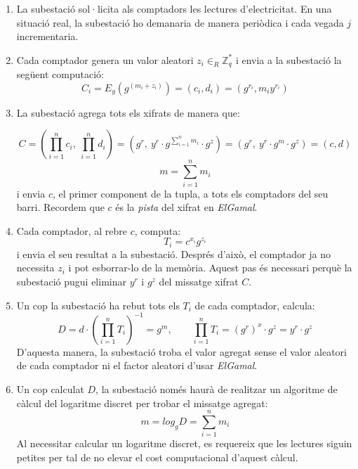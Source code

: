 \begin{enumerate}
	\item La subestació sol·licita als comptadors les lectures d'electricitat. En una situació real, la subestació ho demanaria de manera periòdica i cada vegada $j$ incrementaria.
	\item Cada comptador genera un valor aleatori $z_i \in_R {\mathbb{Z}_{q}^*}$ i envia a la subestació la següent computació: 
	\[C_i = E_y(g^{(m_i + z_i)}) = (c_i, d_i) = (g^{r_i}, m_i y^{r_i})\]
	\item La subestació agrega tots els xifrats de manera que:
	
	\[C = (\prod_{i=1}^{n} c_i, \ \prod_{i=1}^{n} d_i) = (g^r, \ y^r \cdot g ^{\sum_{i=1}^{n} m_i} \cdot g^z) = (g^r, \ y^r \cdot g^m \cdot g^z ) =  (c, d)\]
	\[m = \sum_{i=1}^{n} m_i\]
	i envia $c$, el primer component de la tupla, a tots els comptadors del seu barri. Recordem que $c$ és la \textit{pista} del xifrat en \textit{ElGamal}.
	\label{en:busom-s1}
	\item Cada comptador, al rebre $c$, computa:
	\[T_i = c^{x_i} g^{z_i}\]
	i envia el seu resultat a la subestació. Després d'això, el comptador ja no necessita $z_i$ i pot esborrar-lo de la memòria. Aquest pas és necessari perquè la subestació pugui eliminar $y^r$ i $g^z$ del missatge xifrat $C$.\label{en:busom-m1}
	\item Un cop la subestació ha rebut tots els $T_i$ de cada comptador, calcula:
	\[D = d \cdot (\prod_{i=1}^{n} T_i)^{-1} = g^m, \qquad \prod_{i=1}^{n} T_i = (g^{r})^x \cdot g^z = y^r \cdot g^z\]
	D'aquesta manera, la subestació troba el valor agregat sense el valor aleatori de cada comptador ni el factor aleatori d'usar \textit{ElGamal}.
	\item Un cop calculat $D$, la subestació només haurà de realitzar un algoritme de càlcul del logaritme discret per trobar el missatge agregat:
	\[m = log_g D = \sum_{i=1}^{n} m_i\]
	Al necessitar calcular un logaritme discret, es requereix que les lectures siguin petites per tal de no elevar el cost computacional d'aquest càlcul.
\end{enumerate}
